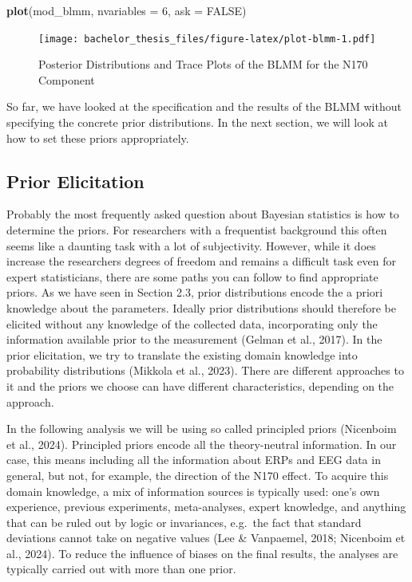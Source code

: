\documentclass[
  doc,12pt,floatsintext]{apa7}
\newenvironment{Shaded}{\begin{snugshade}}{\end{snugshade}}
\newcommand{\AttributeTok}[1]{\textcolor[rgb]{0.13,0.29,0.53}{#1}}
\newcommand{\ConstantTok}[1]{\textcolor[rgb]{0.56,0.35,0.01}{#1}}
\newcommand{\DecValTok}[1]{\textcolor[rgb]{0.00,0.00,0.81}{#1}}
\newcommand{\FunctionTok}[1]{\textcolor[rgb]{0.13,0.29,0.53}{\textbf{#1}}}
\newcommand{\NormalTok}[1]{#1}
\begin{document}
\begin{Shaded}
\begin{Highlighting}[]
\FunctionTok{plot}\NormalTok{(mod\_blmm, }\AttributeTok{nvariables =} \DecValTok{6}\NormalTok{, }\AttributeTok{ask =} \ConstantTok{FALSE}\NormalTok{)}
\end{Highlighting}
\end{Shaded}

\begin{figure}
\centering
\texttt{[image: bachelor\_thesis\_files/figure-latex/plot-blmm-1.pdf]}
\caption{\label{fig:plot-blmm}Posterior Distributions and Trace Plots of the BLMM for the N170 Component}
\end{figure}

So far, we have looked at the specification and the results of the BLMM without specifying the concrete prior distributions. In the next section, we will look at how to set these priors appropriately.

\subsection{Prior Elicitation}\label{prior-elicitation}

Probably the most frequently asked question about Bayesian statistics is how to determine the priors. For researchers with a frequentist background this often seems like a daunting task with a lot of subjectivity. However, while it does increase the researchers degrees of freedom and remains a difficult task even for expert statisticians, there are some paths you can follow to find appropriate priors. As we have seen in Section 2.3, prior distributions encode the a priori knowledge about the parameters. Ideally prior distributions should therefore be elicited without any knowledge of the collected data, incorporating only the information available prior to the measurement (Gelman et al., 2017). In the prior elicitation, we try to translate the existing domain knowledge into probability distributions (Mikkola et al., 2023). There are different approaches to it and the priors we choose can have different characteristics, depending on the approach.

In the following analysis we will be using so called principled priors (Nicenboim et al., 2024). Principled priors encode all the theory-neutral information. In our case, this means including all the information about ERPs and EEG data in general, but not, for example, the direction of the N170 effect. To acquire this domain knowledge, a mix of information sources is typically used: one's own experience, previous experiments, meta-analyses, expert knowledge, and anything that can be ruled out by logic or invariances, e.g.~the fact that standard deviations cannot take on negative values (Lee \& Vanpaemel, 2018; Nicenboim et al., 2024). To reduce the influence of biases on the final results, the analyses are typically carried out with more than one prior.
\end{document}
